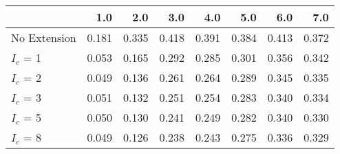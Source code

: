 \begin{tabular}{lrrrrrrr}
\toprule
{} &   1.0 &   2.0 &   3.0 &   4.0 &   5.0 &   6.0 &   7.0 \\
\midrule
No Extension & 0.181 & 0.335 & 0.418 & 0.391 & 0.384 & 0.413 & 0.372 \\
$I_c$ = 1    & 0.053 & 0.165 & 0.292 & 0.285 & 0.301 & 0.356 & 0.342 \\
$I_c$ = 2    & 0.049 & 0.136 & 0.261 & 0.264 & 0.289 & 0.345 & 0.335 \\
$I_c$ = 3    & 0.051 & 0.132 & 0.251 & 0.254 & 0.283 & 0.340 & 0.334 \\
$I_c$ = 5    & 0.050 & 0.130 & 0.241 & 0.249 & 0.282 & 0.340 & 0.330 \\
$I_c$ = 8    & 0.049 & 0.126 & 0.238 & 0.243 & 0.275 & 0.336 & 0.329 \\
\bottomrule
\end{tabular}
